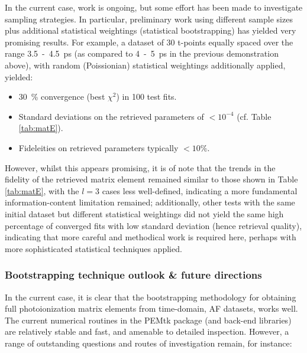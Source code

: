 In the current case, work is ongoing, %
but some effort has been made to investigate sampling strategies. In particular, preliminary work using different sample sizes plus additional statistical weightings (statistical bootstrapping) has yielded very promising results. For example, a dataset of 30 t-points equally spaced over the range 3.5~-~4.5~ps (as compared to 4~-~5~ps in the previous demonstration above), with random (Poissionian) statistical weightings additionally applied, yielded:

\begin{itemize}
\item 30~\% convergence (best $\chi^2$) in 100 test fits.
\item Standard deviations on the retrieved parameters of $<10^{-4}$ (cf. Table \ref{tab:matE}).
\item Fideleities on retrieved parameters typically $<10\%$.
\end{itemize}

However, whilst this appears promising, it is of note that the trends in the fidelity of the retrieved matrix element remained similar to those shown in Table \ref{tab:matE}, with the $l=3$ cases less well-defined, indicating a more fundamental information-content limitation remained; additionally, other tests with the same initial dataset but different statistical weightings did not yield the same high percentage of converged fits with low standard deviation (hence retrieval quality), indicating that more careful and methodical work is required here, perhaps with more sophisticated statistical techniques applied.





\subsubsection{Bootstrapping technique outlook \& future directions}

In the current case, it is clear that the bootstrapping methodology for obtaining full photoionization matrix elements from time-domain, AF datasets, works well. The current numerical routines in the PEMtk package (and back-end libraries) are relatively stable and fast, and amenable to detailed inspection. However, a range of outstanding questions and routes of investigation remain, for instance:

